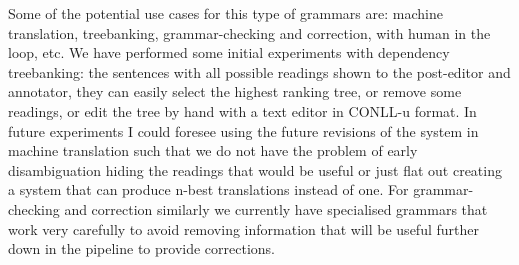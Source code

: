\documentclass[free]{flammie}
\begin{document}
Some of the potential use cases for this type of grammars are: machine
translation, treebanking, grammar-checking and correction, with human in the
loop, etc.  We have performed some initial experiments with dependency
treebanking: the sentences with all possible readings shown to the post-editor
and annotator, they can easily select the highest ranking tree, or remove some
readings, or edit the tree by hand with a text editor in CONLL-u format.  In
future experiments I could foresee using the future revisions of the system in
machine translation such that we do not have the problem of early disambiguation
hiding the readings that would be useful or just flat out creating a system that
can produce n-best translations instead of one.  For grammar-checking and
correction similarly we currently have specialised grammars that work very
carefully to avoid removing information that will be useful further down in the
pipeline to provide corrections.




\end{document}
